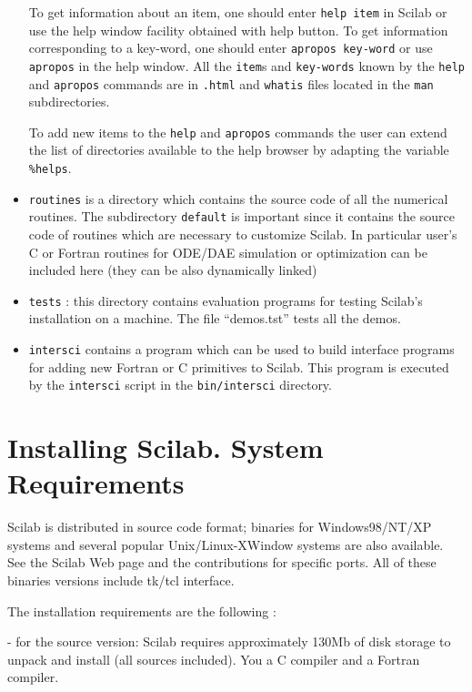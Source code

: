\begin{itemize}
To get information about an item, one should enter 
{\tt help item} 
in Scilab or use the help window facility obtained with help button.
To get information corresponding to a key-word, one should  enter 
{\tt apropos key-word} or use 
{\tt apropos} in the help window. 
All the {\tt item}s and {\tt key-words} known by the {\tt help} and 
{\tt apropos} commands are in {\tt .html} and {\tt whatis} files 
located in the {\tt man} subdirectories.

To add new items to the {\verb!help!} and {\tt apropos} commands 
the user can extend the list of directories available to the help 
browser by adapting the variable \verb!%helps!. 

\item{{\tt routines} is a directory which contains the source code of all
the numerical routines. The subdirectory {\tt default} is important
since it contains the
source code of routines which are necessary to customize Scilab.
In particular user's C or Fortran routines for ODE/DAE simulation 
or optimization can be included here (they can be also dynamically
linked)}

\item{{\tt tests} : this directory contains evaluation programs for testing 
Scilab's installation on a machine. The file ``demos.tst'' tests all the 
demos.}

\item{{\tt intersci} contains a program which can be used to build
interface programs for adding new Fortran or C 
primitives to Scilab. This program is executed by the {\tt intersci}
script in the {\tt bin/intersci} directory.}

\end{itemize}

\section{Installing Scilab. System Requirements}
\label{install}
Scilab is distributed in source code format; binaries for Windows98/NT/XP
systems and several popular Unix/Linux-XWindow systems are also
available. See the Scilab Web page and the contributions for specific
ports. All of these binaries versions include tk/tcl interface.

The installation requirements are the following :

- for the source version: Scilab requires approximately 130Mb of disk
storage to unpack and install (all sources included).  You a C 
compiler and a Fortran compiler.
  
